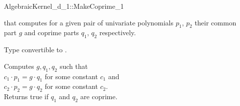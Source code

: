 \begin{ccRefConcept}{AlgebraicKernel_d_1::MakeCoprime_1}

\ccDefinition

 that computes for a given pair of 
univariate polynomials $p_1$, $p_2$ their common part $g$ and 
coprime parts $q_1$, $q_2$ respectively.



        { Type convertible to .}
 

{ Computes $g, q_1, q_2$ such that\\
$c_1 \cdot p_1 =  g \cdot q_1$ for some constant $c_1$ and\\
$c_2 \cdot p_2 =  g \cdot q_2$ for some constant $c_2$.\\
Returns true if $q_1$ and $q_2$ are coprime. 
}

\ccSeeAlso

\end{ccRefConcept}
